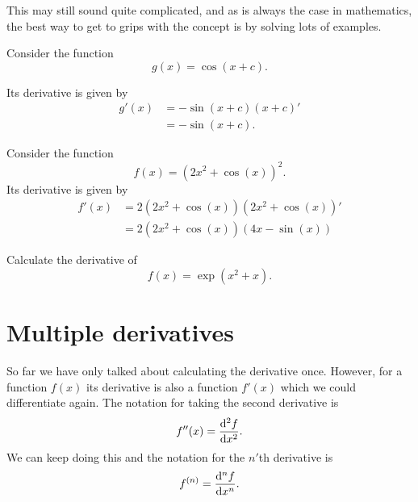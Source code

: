 This may still sound quite complicated, and as is always the case in mathematics, the best way to get to grips with the concept is by solving lots of examples.

\begin{ex}
Consider the function
\begin{equation*}
g(x)=\cos\left(x+c\right).
\end{equation*}

Its derivative is given by
\begin{align*}
g'(x)	&=-\sin\left(x+c\right)\left(x+c\right)'\\
	&=-\sin\left(x+c\right).
\end{align*}
\end{ex}

\begin{ex}
Consider the function 
\begin{equation*}
f(x)=\left(2x^{2}+\cos(x)\right)^{2}.
\end{equation*}
Its derivative is given by
\begin{align*}
f'(x)	&=2\left(2x^{2}+\cos(x)\right)\left(2x^{2}+\cos(x)\right)'\\
	&=2\left(2x^{2}+\cos(x)\right)\left(4x-\sin(x)\right)
\end{align*}
\end{ex}

\begin{exercise}
Calculate the derivative of
\begin{equation*}
 f(x)=\exp\left(x^{2}+x\right).
\end{equation*}
\end{exercise}

\section{Multiple derivatives}
So far we have only talked about calculating the derivative once. However, for a function $f(x)$ its derivative is also a function $f'(x)$ which we could differentiate again. The notation for taking the second derivative is
\begin{equation*}
f''(x)=\frac{\mathrm{d}^{2}f}{\mathrm{d} x^{2}}.
\end{equation*}
We can keep doing this and the notation for the $n'$th derivative is
\begin{equation*}
f^{(n)}=\frac{\mathrm{d}^{n}f}{\mathrm{d} x^{n}}.
\end{equation*}

